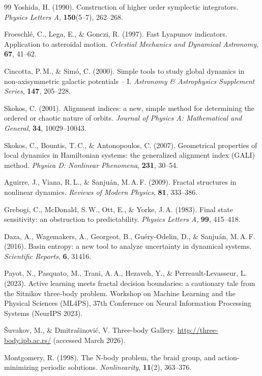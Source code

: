 \documentclass[11pt,a4paper]{article}
\begin{document}
\begin{thebibliography}{99}
Yoshida, H. (1990).
Construction of higher order symplectic integrators.
\textit{Physics Letters A}, \textbf{150}(5--7), 262--268.

Froeschl\'{e}, C., Lega, E., \& Gonczi, R. (1997).
Fast Lyapunov indicators. Application to asteroidal motion.
\textit{Celestial Mechanics and Dynamical Astronomy}, \textbf{67}, 41--62.

Cincotta, P.\,M., \& Sim\'{o}, C. (2000).
Simple tools to study global dynamics in non-axisymmetric galactic potentials -- I.
\textit{Astronomy \& Astrophysics Supplement Series}, \textbf{147}, 205--228.

Skokos, C. (2001).
Alignment indices: a new, simple method for determining the ordered or chaotic nature of orbits.
\textit{Journal of Physics A: Mathematical and General}, \textbf{34}, 10029--10043.

Skokos, C., Bountis, T.\,C., \& Antonopoulos, C. (2007).
Geometrical properties of local dynamics in Hamiltonian systems: the generalized alignment index (GALI) method.
\textit{Physica D: Nonlinear Phenomena}, \textbf{231}, 30--54.

Aguirre, J., Viana, R.\,L., \& Sanju\'{a}n, M.\,A.\,F. (2009).
Fractal structures in nonlinear dynamics.
\textit{Reviews of Modern Physics}, \textbf{81}, 333--386.

Grebogi, C., McDonald, S.\,W., Ott, E., \& Yorke, J.\,A. (1983).
Final state sensitivity: an obstruction to predictability.
\textit{Physics Letters A}, \textbf{99}, 415--418.

Daza, A., Wagemakers, A., Georgeot, B., Gu\'{e}ry-Odelin, D., \& Sanju\'{a}n, M.\,A.\,F. (2016).
Basin entropy: a new tool to analyze uncertainty in dynamical systems.
\textit{Scientific Reports}, \textbf{6}, 31416.

Payot, N., Pasquato, M., Trani, A.\,A., Hezaveh, Y., \& Perreault-Levasseur, L. (2023).
Active learning meets fractal decision boundaries: a cautionary tale from the Sitnikov three-body problem.
Workshop on Machine Learning and the Physical Sciences (ML4PS), 37th Conference on Neural Information Processing Systems (NeurIPS 2023).

{\v{S}}uvakov, M., \& Dmitra{\v{s}}inovi{\'c}, V.
Three-body Gallery.
\url{http://three-body.ipb.ac.rs/} (accessed March 2026).

Montgomery, R. (1998).
The N-body problem, the braid group, and action-minimizing periodic solutions.
\textit{Nonlinearity}, \textbf{11}(2), 363--376.


\end{thebibliography}
\end{document}
